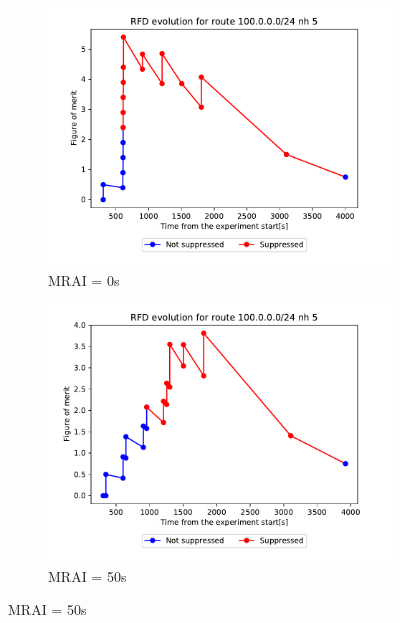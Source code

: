 \begin{figure}[h]
     \centering
     \begin{subfigure}[b]{0.3\textwidth}
         \centering
         \includegraphics[width=\textwidth]{images/RFD/clique/FigureOfMerit/mrai1_RFD_x_rfd_R1.pdf}
         \caption{MRAI = 0s}
         \label{fig:clique_x_mrai0}
     \end{subfigure}
     \hfill
     \begin{subfigure}[b]{0.3\textwidth}
         \centering
         \includegraphics[width=\textwidth]{images/RFD/clique/FigureOfMerit/mrai11_RFD_x_rfd_R1.pdf}
         \caption{MRAI = 50s}
         \label{fig:clique_x_mrai50}
     \end{subfigure}

\end{figure}
